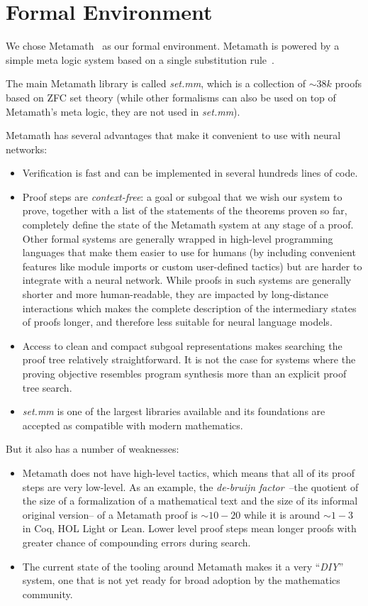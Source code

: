\documentclass{article}
\begin{document}
\section{Formal Environment}

We chose Metamath~\cite{megill2019metamath} as our formal environment. Metamath is powered by a simple meta logic system based on a single substitution rule~\cite{megill2006how}.

The main Metamath library is called \textit{set.mm}, which is a collection of $\sim 38k$ proofs based on ZFC set theory (while other formalisms can also be used on top of Metamath's meta logic, they are not used in {\it set.mm}).

Metamath has several advantages that make it convenient to use with neural networks:
\begin{itemize}
  \item Verification is fast and can be implemented in several hundreds lines of code.
  \item Proof steps are \textit{context-free}: a goal or subgoal that we wish our system to prove, together with a list of the statements of the theorems proven so far, completely define the state of the Metamath system at any stage of a proof. Other formal systems are generally wrapped in high-level programming languages that make them easier to use for humans (by including convenient features like module imports or custom user-defined tactics) but are harder to integrate with a neural network. While proofs in such systems are generally shorter and more human-readable, they are impacted by long-distance interactions which makes the complete description of the intermediary states of proofs longer, and therefore less suitable for neural language models.
  \item Access to clean and compact subgoal representations makes searching the proof tree relatively straightforward. It is not the case for systems where the proving objective resembles program synthesis more than an explicit proof tree search.
  \item \textit{set.mm} is one of the largest libraries available and its foundations are accepted as compatible with modern mathematics.
\end{itemize}

But it also has a number of weaknesses:
\begin{itemize}
  \item Metamath does not have high-level tactics, which means that all of its proof steps are very low-level. As an example, the \textit{de-bruijn factor}~\cite{wiedijk2014debruijn}--the quotient of the size of a formalization of a mathematical text and the size of its informal original version-- of a Metamath proof is $\sim10-20$ while it is around $\sim1-3$ in Coq, HOL Light or Lean.  Lower level proof steps mean longer proofs with greater chance of compounding errors during search.
  \item The current state of the tooling around Metamath makes it a very ``\textit{DIY}'' system, one that is not yet ready for broad adoption by the mathematics community.
\end{itemize}
\end{document}
